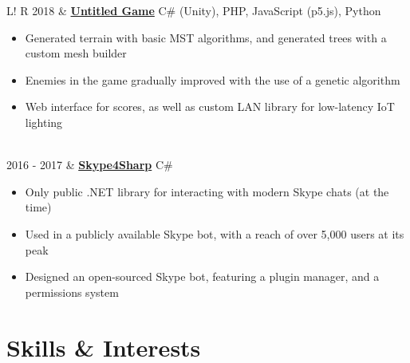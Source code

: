 \documentclass[10pt, a4paper]{article}
\newcommand\vsep{\color{lightgray} \vrule width 0.5pt}
\newcommand\sect[1]{\section*{\Large\sc #1}}
\newcommand\itemizespace{\vspace{-0.65\baselineskip}}
\begin{document}
\begin{tabular}{L!{\vsep}R}
                2018 & \href{https://github.com/lin-e/CSProject2017}{\textbf{Untitled Game}} \hfill C\# (Unity), PHP, JavaScript (p5.js), Python
                \begin{itemize}[label=\raisebox{0.25ex}{\tiny$\bullet$}]
                    \setlength{\itemindent}{-0.1in}
                    \item Generated terrain with basic MST algorithms, and generated trees with a custom mesh builder
                    \item Enemies in the game gradually improved with the use of a genetic algorithm
                    \item Web interface for scores, as well as custom LAN library for low-latency IoT lighting
                    \itemizespace
                \end{itemize} \\
                2016 - 2017 & \href{https://github.com/lin-e/Skype4Sharp}{\textbf{Skype4Sharp}} \hfill C\#
                \begin{itemize}[label=\raisebox{0.25ex}{\tiny$\bullet$}]
                    \setlength{\itemindent}{-0.1in}
                    \item Only public .NET library for interacting with modern Skype chats (at the time)
                    \item Used in a publicly available Skype bot, with a reach of over 5,000 users at its peak
                    \item Designed an open-sourced Skype bot, featuring a plugin manager, and a permissions system
                    \vspace{-\baselineskip}
                \end{itemize}
            \end{tabular}
        \sect{Skills \& Interests}
\end{document}
